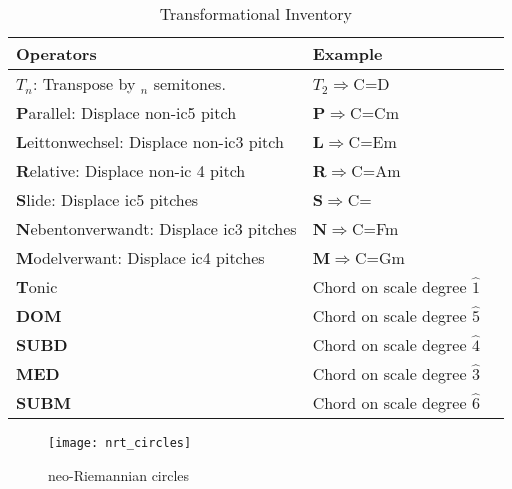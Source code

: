 \begin{table}
	\small
	\begin{tabularx}{\textwidth}{lll}
		\textbf{Operators}                              				& \textbf{Example}                     	\\
		\toprule
		\(T_{n}\): Transpose by \(_{n}\) semitones.    		& \textbf{\(T_{2}\)}\(\Rightarrow\)C=D	\\
		\textbf{P}arallel: Displace non-ic5 pitch       		& \textbf{P}\(\Rightarrow\)C=Cm      	\\
		\textbf{L}eittonwechsel: Displace non-ic3 pitch 		& \textbf{L}\(\Rightarrow\)C=Em      	\\
		\textbf{R}elative: Displace non-ic 4 pitch      		& \textbf{R}\(\Rightarrow\)C=Am      	\\
		\textbf{S}lide: Displace ic5 pitches            			& \textbf{S}\(\Rightarrow\)C=\cissm 	\\
		\textbf{N}ebentonverwandt: Displace ic3 pitches 	& \textbf{N}\(\Rightarrow\)C=Fm      	\\
		\textbf{M}odelverwant: Displace ic4 pitches     		& \textbf{M}\(\Rightarrow\)C=Gm     	\\
		\textbf{T}onic								& Chord on scale degree \(\hat{1}\) 	\\
		\textbf{DOM}								& Chord on scale degree \(\hat{5}\)	\\
		\textbf{SUBD}								& Chord on scale degree \(\hat{4}\)	\\
		\textbf{MED}								& Chord on scale degree \(\hat{3}\)	\\
		\textbf{SUBM}								& Chord on scale degree \(\hat{6}\)	\\
		\bottomrule
	\end{tabularx}
	\caption{Transformational Inventory}
    	\label{tb:transformational_inventory}
\end{table}

\begin{figure*}[h!]
\texttt{\texttt{[image: nrt\_circles]}
}\caption{neo-Riemannian circles}
\label{fg:nrt_circles}
\end{figure*}

